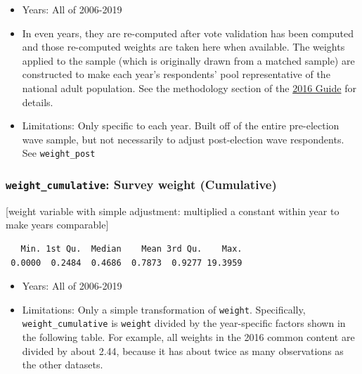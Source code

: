 \documentclass[10pt,article,oneside]{memoir}
\theoremstyle{definition}
\begin{document}
\begin{itemize}
\tightlist
\item
  Years: All of 2006-2019
\item
  In even years, they are re-computed after vote validation has been
  computed and those re-computed weights are taken here when available.
  The weights applied to the sample (which is originally drawn from a
  matched sample) are constructed to make each year's respondents' pool
  representative of the national adult population. See the methodology
  section of the
  \href{https://dataverse.harvard.edu/api/access/datafile/3047286}{2016
  Guide} for details.
\item
  Limitations: Only specific to each year. Built off of the entire
  pre-election wave sample, but not necessarily to adjust post-election
  wave respondents. See \texttt{weight\_post}
\end{itemize}

\hypertarget{weight_cumulative-survey-weight-cumulative}{%
\subsubsection{\texorpdfstring{\texttt{weight\_cumulative}: Survey
weight
(Cumulative)}{weight\_cumulative: Survey weight (Cumulative)}}\label{weight_cumulative-survey-weight-cumulative}}

{[}weight variable with simple adjustment: multiplied a constant within
year to make years comparable{]}

\begin{verbatim}
   Min. 1st Qu.  Median    Mean 3rd Qu.    Max. 
 0.0000  0.2484  0.4686  0.7873  0.9277 19.3959 
\end{verbatim}

\begin{itemize}
\tightlist
\item
  Years: All of 2006-2019
\item
  Limitations: Only a simple transformation of \texttt{weight}.
  Specifically, \texttt{weight\_cumulative} is \texttt{weight} divided
  by the year-specific factors shown in the following table. For
  example, all weights in the 2016 common content are divided by about
  2.44, because it has about twice as many observations as the other
  datasets.
\end{itemize}
\end{document}
